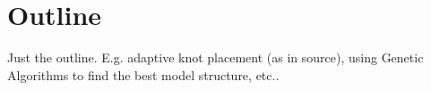 

\chapter{Outline}
	
Just the outline. E.g. adaptive knot placement (as in source), using Genetic Algorithms to find the best model structure, etc..
	